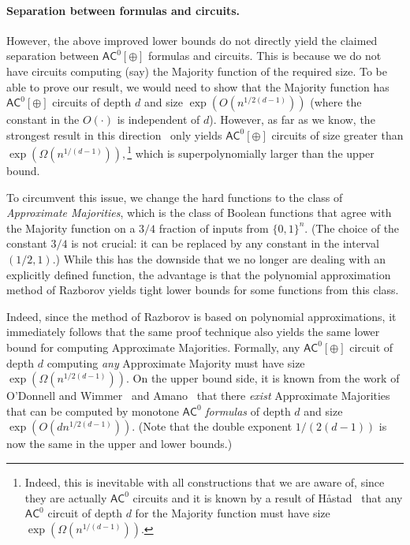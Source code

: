 \documentclass[11pt]{article}
\numberwithin{equation}{section}
\theoremstyle{definition}
\theoremstyle{plain}
\newcommand{\cclass}[1]{\textsf{#1}}
\newcommand{\AC}{\cclass{AC}}
\begin{document}
\paragraph{Separation between formulas and circuits.} However, the above improved lower bounds do not directly yield the claimed separation between $\AC^0[\oplus]$ formulas and circuits. This is because we do not have circuits computing (say) the Majority function of the required size. To be able to prove our result, we would need to show that the Majority function has $\AC^0[\oplus]$ circuits of depth $d$ and size $\exp(O(n^{1/2(d-1)}))$ (where the constant in the $O(\cdot)$ is independent of $d$). However, as far as we know, the strongest result in this direction~\cite{KPPY84majubd} only yields $\AC^0[\oplus]$ circuits of size greater than 
$\exp(\Omega(n^{1/(d-1)})),$\footnote{Indeed, this is inevitable with all constructions that we are aware of, since they are actually $\AC^0$ circuits and it is known by a result of H\r{a}stad~\cite{Hastad} that any $\AC^0$ circuit of depth $d$ for the Majority function must have size $\exp(\Omega(n^{1/(d-1)}))$.} which is superpolynomially larger than the upper bound.

To circumvent this issue, we change the hard functions to the class of \emph{Approximate Majorities}, which is the class of Boolean functions that agree with
the  %
%
%
%
Majority function on a $3/4$ fraction of inputs from $\{0,1\}^n$. (The choice of the constant $3/4$ is not crucial: it can be replaced by any constant in the interval $(1/2,1)$.)
%
While this has the downside that we no longer are dealing with an explicitly defined function, the advantage is that the polynomial approximation method of Razborov yields tight lower bounds for some functions from this class. 

Indeed, since the method of Razborov is based on polynomial approximations, it immediately follows that the same proof technique also yields the same lower bound for computing Approximate Majorities. Formally, any $\AC^0[\oplus]$ circuit of depth $d$ computing \emph{any} Approximate Majority must have size $\exp(\Omega(n^{1/2(d-1)}))$. On the upper bound side, it is known from the work of O'Donnell and Wimmer~\cite{odonnellwimmer} and Amano~\cite{Amano-appxmaj} that there \emph{exist} Approximate Majorities that can be computed by monotone $\AC^0$ \emph{formulas} of depth $d$ and size $\exp(O(dn^{1/2(d-1)}))$. (Note that the double exponent ${1}/{(2(d-1))}$ is now the same in the upper and lower bounds.)
\end{document}
